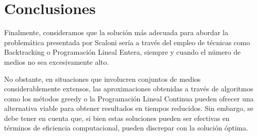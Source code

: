 \section{Conclusiones}

Finalmente, consideramos que la solución más adecuada para abordar la problemática presentada por Scaloni sería a través del empleo de técnicas como Backtracking o Programación Lineal Entera, siempre y cuando el número de medios no sea excesivamente alto. 

No obstante, en situaciones que involucren conjuntos de medios considerablemente extensos, las aproximaciones obtenidas a través de algoritmos como los métodos greedy o la Programación Lineal Continua pueden ofrecer una alternativa viable para obtener resultados en tiempos reducidos. Sin embargo, se debe tener en cuenta que, si bien estas soluciones pueden ser efectivas en términos de eficiencia computacional, pueden discrepar con la solución óptima.
